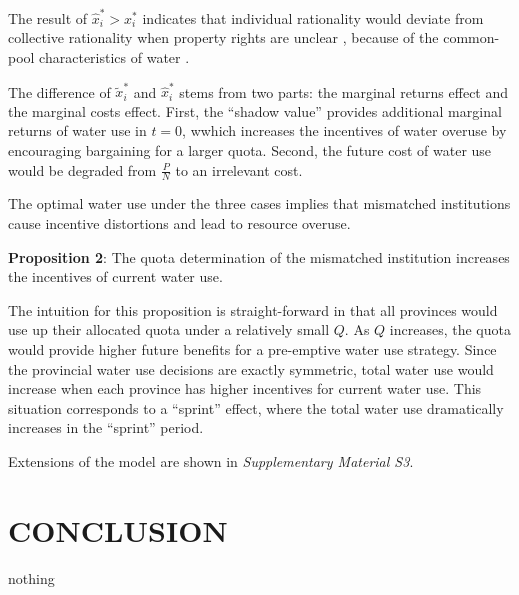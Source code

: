 \documentclass{nsr}
\begin{document}
The result of $\hat x_i^*>x_i^*$ indicates that individual rationality would deviate from collective rationality when property rights are unclear \cite{hardinTragedyCommons2009}, because of the common-pool characteristics of water
\cite{castilla-rhoGroundwaterCommonPool2020,ostromGeneralFrameworkAnalyzing2009}.

The difference of $\widetilde x_i^*$ and $\hat x_i^*$ stems from two parts: the marginal returns effect and the marginal costs effect. First, the “shadow value” provides additional marginal returns of water use in $t=0$, wwhich increases the incentives of water overuse by encouraging bargaining for a larger quota. Second, the future cost of water use would be degraded from $\frac{P}{N}$ to an irrelevant cost.

The optimal water use under the three cases implies that mismatched institutions cause incentive distortions and lead to resource overuse.

\textbf{Proposition 2}: The quota determination of the mismatched institution increases the incentives of current water use.

The intuition for this proposition is straight-forward in that all provinces would use up their allocated quota under a relatively small $Q$. As $Q$ increases, the quota would provide higher future benefits for a pre-emptive water use strategy. Since the provincial water use decisions are exactly symmetric, total water use would increase when each province has higher incentives for current water use. This situation corresponds to a “sprint” effect, where the total water use dramatically increases in the “sprint” period.

Extensions of the model are shown in \textit{Supplementary Material S3}.


\section{CONCLUSION}\label{conclusion}
nothing

\appendix
\label{appendix}




\end{document}
